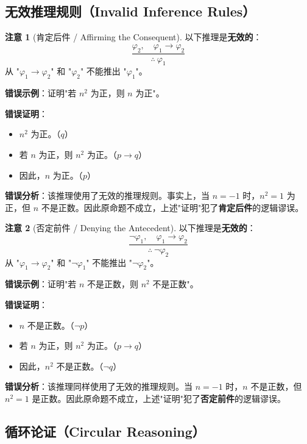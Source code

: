 \documentclass[UTF8,11pt,a4paper]{ctexbook}   %
\theoremstyle{definition}
\newtheorem{warning}{注意}[section]
\begin{document}
\subsection{无效推理规则（Invalid Inference Rules）}

\begin{warning}[肯定后件 / Affirming the Consequent]
以下推理是\textbf{无效的}：
\[
\frac{\varphi_2,\quad \varphi_1 \to \varphi_2}{\therefore\ \varphi_1}
\]
从 "$\varphi_1 \to \varphi_2$" 和 "$\varphi_2$" 不能推出 "$\varphi_1$"。

\textbf{错误示例}：证明"若 $n^2$ 为正，则 $n$ 为正"。

\textbf{错误证明}：
\begin{itemize}
    \item $n^2$ 为正。（$q$）
    \item 若 $n$ 为正，则 $n^2$ 为正。（$p \to q$）
    \item 因此，$n$ 为正。（$p$）
\end{itemize}

\textbf{错误分析}：该推理使用了无效的推理规则。事实上，当 $n=-1$ 时，$n^2=1$ 为正，但 $n$ 不是正数。因此原命题不成立，上述"证明"犯了\textbf{肯定后件}的逻辑谬误。
\end{warning}

\begin{warning}[否定前件 / Denying the Antecedent]
以下推理是\textbf{无效的}：
\[
\frac{\neg\varphi_1,\quad \varphi_1 \to \varphi_2}{\therefore\ \neg\varphi_2}
\]
从 "$\varphi_1 \to \varphi_2$" 和 "$\neg\varphi_1$" 不能推出 "$\neg\varphi_2$"。

\textbf{错误示例}：证明"若 $n$ 不是正数，则 $n^2$ 不是正数"。

\textbf{错误证明}：
\begin{itemize}
    \item $n$ 不是正数。（$\neg p$）
    \item 若 $n$ 为正，则 $n^2$ 为正。（$p \to q$）
    \item 因此，$n^2$ 不是正数。（$\neg q$）
\end{itemize}

\textbf{错误分析}：该推理同样使用了无效的推理规则。当 $n=-1$ 时，$n$ 不是正数，但 $n^2=1$ 是正数。因此原命题不成立，上述"证明"犯了\textbf{否定前件}的逻辑谬误。
\end{warning}

\subsection{循环论证（Circular Reasoning）}
\end{document}
